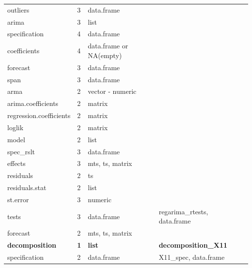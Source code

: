 \documentclass[article]{jss}
\begin{document}
\begin{longtable}[t]{lllll}
\hspace{3em}outliers & 3 & data.frame &  & \\
\addlinespace
\hspace{3em}arima & 3 & list &  & \\
\hspace{4em}specification & 4 & data.frame &  & \\
\hspace{4em}coefficients & 4 & data.frame or NA(empty) &  & \\
\hspace{3em}forecast & 3 & data.frame &  & \\
\hspace{3em}span & 3 & data.frame &  & \\
\addlinespace
\hspace{2em}arma & 2 & vector - numeric &  & \\
\hspace{2em}arima.coefficients & 2 & matrix &  & \\
\hspace{2em}regression.coefficients & 2 & matrix &  & \\
\hspace{2em}loglik & 2 & matrix &  & \\
\hspace{2em}model & 2 & list &  \vphantom{1} & \\
\addlinespace
\hspace{3em}spec\_rslt & 3 & data.frame &  & \\
\hspace{3em}effects & 3 & mts, ts, matrix &  & \\
\hspace{2em}residuals & 2 & ts &  & \\
\hspace{2em}residuals.stat & 2 & list &  & \\
\hspace{3em}st.error & 3 & numeric &  & \\
\addlinespace
\hspace{3em}tests & 3 & data.frame & regarima\_rtests, data.frame & \\
\hspace{2em}forecast & 2 & mts, ts, matrix &  & \\
\textbf{\hspace{1em}decomposition} & \textbf{1} & \textbf{list} & \textbf{decomposition\_X11}\\
\hspace{2em}specification & 2 & data.frame & X11\_spec, data.frame & \\

\end{longtable}
\end{document}
